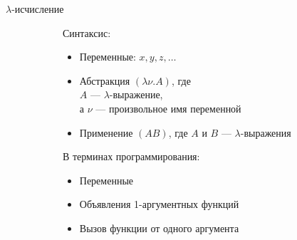 \begin{frame}{$\lambda$-исчисление}
\begin{figure}[t]
  \begin{subfigure}[t]{0.35\textwidth}
    \vspace{-5em}
    \vspace{-1em}
    Синтаксис:
    \begin{itemize}
      \item Переменные: $x,y,z,\dots$
      \item Абстракция $(\lambda \nu. A)$, где \\
      $A$ --- $\lambda$-выражение, \\
      а $\nu$ --- произвольное имя переменной
      \item Применение $(AB)$, где $A$ и $B$ --- $\lambda$-выражения
    \end{itemize}
  \end{subfigure}
\hspace{1cm}
  \begin{subfigure}[t]{0.55\textwidth}

      \vspace{-5.5em}
В терминах программирования:
\begin{itemize}
  \item Переменные
  \item Объявления 1-аргументных функций
  \item Вызов функции от одного аргумента
\end{itemize}
\end{subfigure}
\end{figure}
\end{frame}

